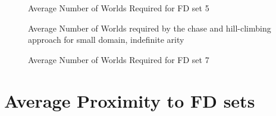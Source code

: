 \begin{figure}
\begin{minipage}{7cm}
\centerline{}
\caption{\label{graph:4.8w} {Average Number of Worlds
Required for FD set 4}}
\end{minipage}
\hfill
\begin{minipage}{7cm}
\centerline{}
\caption{\label{graph:4.10w} {Average Number of Worlds
Required for FD set 5}}
\end{minipage}
\end{figure}



\begin{figure}
\begin{minipage}{7cm}
\centerline{}
\caption{\label{graph:4.12w} {Average Number of Worlds
Required for FD set 6}}
\end{minipage}
\hfill
\begin{minipage}{7cm}
\centerline{}
\caption{\label{graph:4.13w} {Average Number of Worlds required by
the chase and hill-climbing approach for small domain, indefinite arity}}
\end{minipage}
\end{figure}



\begin{figure}
\begin{minipage}{7cm}
\centerline{}
\caption{\label{graph:4.15w} {Average Number of Worlds required by
the chase and hill-climbing approach for small domain, indefinite arity}}
\end{minipage}
\hfill
\begin{minipage}{7cm}
\centerline{}
\caption{\label{graph:4.16w} {Average Number of Worlds
Required for FD set 7}}
\end{minipage}
\end{figure}






\section{Average Proximity to FD sets}

